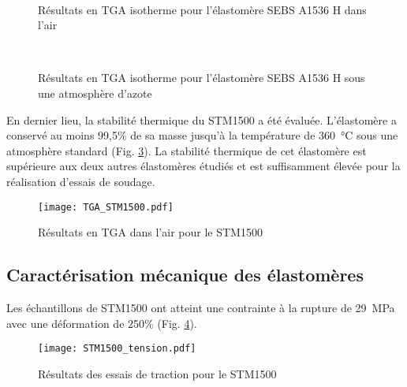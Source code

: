 \begin{figure}[h]
	\centering
	\\
	\caption{Résultats en TGA isotherme pour l'élastomère SEBS A1536 H dans l'air}
	\label{fig:TGA_iso_SEBS_air}
	\end{figure}
	
	\begin{figure}[h]
	\centering
	\\
	\caption{Résultats en TGA isotherme pour l'élastomère SEBS A1536 H sous une atmosphère d'azote}
	\label{fig:TGA_iso_SEBS_N2}
\end{figure}

En dernier lieu, la stabilité thermique du STM1500 a été évaluée. 
L'élastomère a conservé au moins 99,5\% de sa masse jusqu'à la température de \SI{360}{\celsius} sous une atmosphère standard (Fig. \ref{fig:TGA_STM1500}). 
La stabilité thermique de cet élastomère est supérieure aux deux autres élastomères étudiés et est suffisamment élevée pour la réalisation d'essais de soudage. 

\begin{figure}[h]
	\centering
	\texttt{[image: TGA\_STM1500.pdf]}
	\caption{Résultats en TGA dans l'air pour le STM1500}
	\label{fig:TGA_STM1500}
\end{figure}

\FloatBarrier
\subsection{Caractérisation mécanique des élastomères}

Les échantillons de STM1500 ont atteint une contrainte à la rupture de \SI{29}{\mega\pascal} avec une déformation de 250\% (Fig. \ref{fig:STM1500_tension}). 

\begin{figure}[h]
	\centering
	\texttt{[image: STM1500\_tension.pdf]}
	\caption{Résultats des essais de traction pour le STM1500}
	\label{fig:STM1500_tension}
\end{figure}

